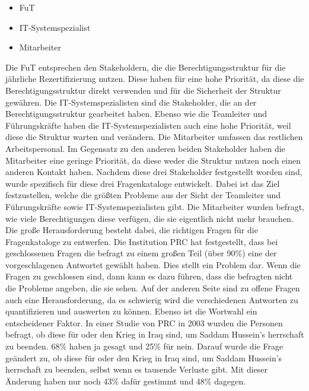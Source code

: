 \begin{itemize}
	\item \ac{FuT}
	\item IT-Systemspezialist
	\item Mitarbeiter
\end{itemize}
Die \ac{FuT} entsprechen den Stakeholdern, die die Berechtigungsstruktur für die jährliche Rezertifizierung nutzen.
Diese haben für eine hohe Priorität, da diese die Berechtigungsstruktur direkt verwenden und für die Sicherheit der Struktur gewähren.
\newline
Die IT-Systemspezialisten sind die Stakeholder, die an der Berechtigungsstruktur gearbeitet haben.
Ebenso wie die Teamleiter und Führungskräfte haben die IT-Systemspezialisten auch eine hohe Priorität, weil diese die Struktur warten und verändern.
\newline
Die Mitarbeiter umfassen das restlichen Arbeitspersonal.
Im Gegensatz zu den anderen beiden Stakeholder haben die Mitarbeiter eine geringe Priorität, da diese weder die Struktur nutzen noch einen anderen Kontakt haben.
\newline
\newline
Nachdem diese drei Stakeholder festgestellt worden sind, wurde spezifisch für diese drei Fragenkataloge entwickelt.
Dabei ist das Ziel festzustellen, welche die größten Probleme aus der Sicht der Teamleiter und Führungskräfte sowie IT-Systemspezialisten gibt.
Die Mitarbeiter wurden befragt, wie viele Berechtigungen diese verfügen, die sie eigentlich nicht mehr brauchen.
Die große Herausforderung besteht dabei, die richtigen Fragen für die Fragenkataloge zu entwerfen.
Die Institution \ac{PRC} hat festgestellt, dass bei geschlossenen Fragen die befragt zu einem großen Teil (über 90\%) eine der vorgeschlagenen Antwortet gewählt haben. \cite{Survey}
Dies stellt ein Problem dar.
Wenn die Fragen zu geschlossen sind, dann kann es dazu führen, dass die befragten nicht die Probleme angeben, die sie sehen.
Auf der anderen Seite sind zu offene Fragen auch eine Herausforderung, da es schwierig wird die verschiedenen Antworten zu quantifizieren und auswerten zu können.
Ebenso ist die Wortwahl ein entscheidener Faktor.
In einer Studie von \ac{PRC} in 2003 wurden die Personen befragt, ob diese für oder den Krieg in Iraq sind, um Saddam Hussein's herrschaft zu beenden.
68\% haben ja gesagt und 25\% für nein.
Darauf wurde die Frage geändert zu, ob diese für oder den Krieg in Iraq sind, um Saddam Hussein's herrschaft zu beenden, selbst wenn es tausende Verluste gibt.
Mit dieser Änderung haben nur noch 43\% dafür gestimmt und 48\% dagegen. \cite{Survey}
